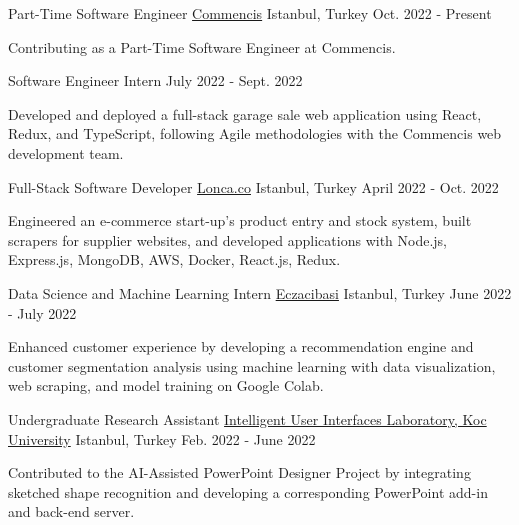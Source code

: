 
\begin{cventries}

  \cventry
    {Part-Time Software Engineer}
    {\href{https://www.commencis.com}{Commencis}}
    {Istanbul, Turkey}
    {Oct. 2022 - Present}
    {
      \begin{cvitems}
        \item {Contributing as a Part-Time Software Engineer at Commencis.}
      \end{cvitems}
    }

  \cventry
    {Software Engineer Intern}
    {}
    {}
    {July 2022 - Sept. 2022}
    {
      \begin{cvitems}
        \item {Developed and deployed a full-stack garage sale web application using React, Redux, and TypeScript, following Agile methodologies with the Commencis web development team.}
      \end{cvitems}
    }

  \cventry
    {Full-Stack Software Developer}
    {\href{https://lonca.co}{Lonca.co}}
    {Istanbul, Turkey}
    {April 2022 - Oct. 2022}
    {
      \begin{cvitems}
        \item {Engineered an e-commerce start-up's product entry and stock system, built scrapers for supplier websites, and developed applications with Node.js, Express.js, MongoDB, AWS, Docker, React.js, Redux.}
      \end{cvitems}
    }

  \cventry
    {Data Science and Machine Learning Intern}
    {\href{https://www.eczacibasi.com.tr/en/home}{Eczacibasi}}
    {Istanbul, Turkey}
    {June 2022 - July 2022}
    {
      \begin{cvitems}
        \item {Enhanced customer experience by developing a recommendation engine and customer segmentation analysis using machine learning with data visualization, web scraping, and model training on Google Colab.}
      \end{cvitems}
    }

  \cventry
    {Undergraduate Research Assistant}
    {\href{https://iui.ku.edu.tr}{Intelligent User Interfaces Laboratory, Koc University}}
    {Istanbul, Turkey}
    {Feb. 2022 - June 2022}
    {
      \begin{cvitems}
        \item {Contributed to the AI-Assisted PowerPoint Designer Project by integrating sketched shape recognition and developing a corresponding PowerPoint add-in and back-end server.}
      \end{cvitems}
    }


\end{cventries}

